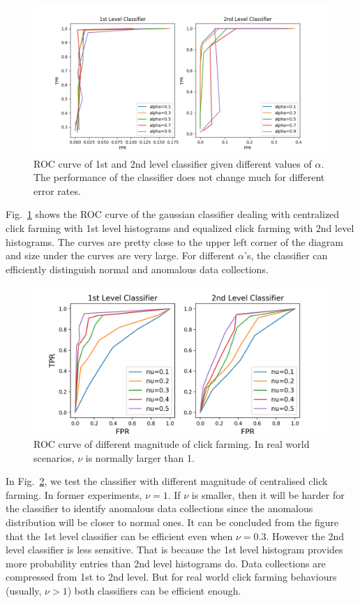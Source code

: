 \documentclass[10pt,conference,letterpaper]{IEEEtran}
\begin{document}
			\begin{figure}[!t]
				\centering
				\includegraphics[width=\linewidth]{fig/ROC-Alpha.png}
				\caption{ROC curve of 1st and 2nd level classifier given different values of $\alpha$. The performance of the classifier does not change much for different error rates.}
				\label{fig:roc-alpha}
			\end{figure}
	
			Fig.~\ref{fig:roc-alpha} shows the ROC curve of the gaussian classifier dealing with centralized click farming with 1st level histograms and equalized click farming with 2nd level histograms. The curves are pretty close to the upper left corner of the diagram and size under the curves are very large. For different $\alpha$'s, the classifier can efficiently distinguish normal and anomalous data collections.
			
			\begin{figure}[!t]
				\centering
				\includegraphics[width=\linewidth]{fig/ROC-Nu.png}
				\caption{ROC curve of different magnitude of click farming. In real world scenarios, $\nu$ is normally larger than 1.}
				\label{fig:roc-magnitude}
			\end{figure}
	
			In Fig.~\ref{fig:roc-magnitude}, we test the classifier with different magnitude of centralised click farming. In former experiments, $\nu = 1$. If $\nu $ is smaller, then it will be harder for the classifier to identify anomalous data collections since the anomalous distribution will be closer to normal ones. It can be concluded from the figure that the 1st level classifier can be efficient even when $\nu = 0.3$. However the 2nd level classifier is less sensitive. That is because the 1st level histogram provides more probability entries than 2nd level histograms do. Data collections are compressed from 1st to 2nd level. But for real world click farming behaviours (usually, $\nu > 1$) both classifiers can be efficient enough.
	
\end{document}

